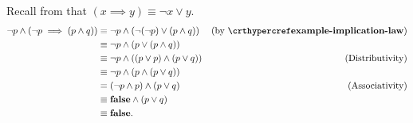 \begin{questions}
    \item Recall from  that $(x \implies y) \equiv \lnot x \lor y$.
    \begin{align*}
        \lnot p \land (\lnot p \implies (p \land q)) &\equiv \lnot p \land (\lnot(\lnot p) \lor (p \land q)) & (\text{by } \myref{example-implication-law})\\
        &\equiv \lnot p \land (p \lor (p \land q))\\
        &\equiv \lnot p \land ((p \lor p) \land (p \lor q)) & (\text{Distributivity})\\
        &\equiv \lnot p \land (p \land (p \lor q))\\
        &\equiv (\lnot p \land p) \land (p \lor q) & (\text{Associativity})\\
        &\equiv \textbf{false} \land (p \lor q)\\
        &\equiv \textbf{false}.
    \end{align*}
\end{questions}
